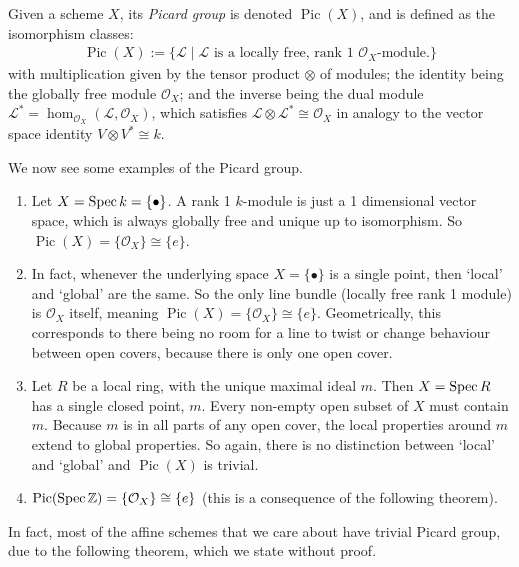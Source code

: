 \begin{definition}
	Given a scheme $X$, its \emph{Picard group} is denoted $\operatorname{Pic}(X)$, and is defined as the isomorphism classes:
	\begin{align*}
		\operatorname{Pic}(X) := \{ \mathcal{L} \; \vert \;  \text{$\mathcal{L}$ is a locally free, rank 1 $\mathcal{O}_X$-module.}  \}
	\end{align*}
	with multiplication given by the tensor product $\otimes$ of modules; the identity being the globally free module $\mathcal{O}_X$; and the inverse being the dual module $\mathcal{L}^* = \hom_{\mathcal{O}_X} (\mathcal{L}, \mathcal{O}_X)$, which satisfies $\mathcal{L} \otimes \mathcal{L}^* \cong \mathcal{O}_X$ in analogy to the vector space identity $V \otimes V^* \cong k$.
\end{definition}



\begin{example}
	We now see some examples of the Picard group.
	\begin{enumerate}
		\item Let $X = \operatorname{Spec} k = \{ \bullet \}$. A rank 1 $k$-module is just a 1 dimensional vector space, which is always globally free and unique up to isomorphism. So $\operatorname{Pic}(X) = \{\mathcal{O}_X\} \cong \{e\}$.
		\item In fact, whenever the underlying space $X = \{\bullet\}$ is a single point, then `local' and `global' are the same. So the only line bundle (locally free rank 1 module) is $\mathcal{O}_X$ itself, meaning $\operatorname{Pic}(X) = \{\mathcal{O}_X\} \cong \{e\}$. Geometrically, this corresponds to there being no room for a line to twist or change behaviour between open covers, because there is only one open cover.
		\item Let $R$ be a local ring, with the unique maximal ideal $m$. Then $X = \operatorname{Spec} R$ has a single closed point, $m$. Every non-empty open subset of $X$ must contain $m$. Because $m$ is in all parts of any open cover, the local properties around $m$ extend to global properties. So again, there is no distinction between `local' and `global' and $\operatorname{Pic}(X)$ is trivial.
		\item $\operatorname{Pic}(\operatorname{Spec} \mathbb{Z}) = \{\mathcal{O}_X\} \cong \{e\}$ (this is a consequence of the following theorem).
	\end{enumerate}
\end{example}

In fact, most of the affine schemes that we care about have trivial Picard group, due to the following theorem, which we state without proof.

